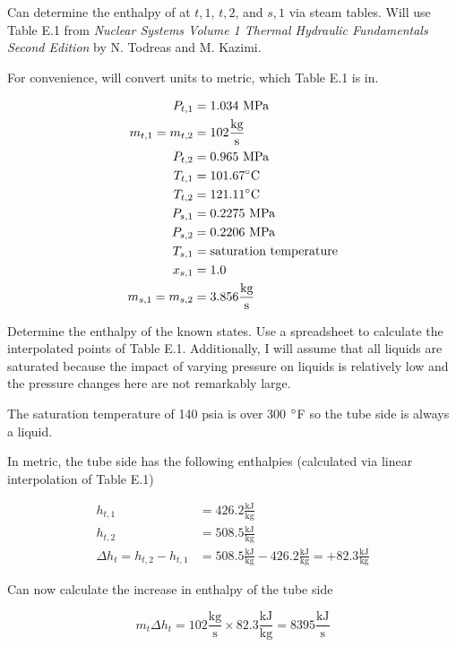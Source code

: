 \documentclass{article}
\begin{document}
Can determine the enthalpy of at $t,1$, $t,2$, and $s,1$ via steam tables. Will use Table E.1 from \textit{Nuclear Systems Volume 1 Thermal Hydraulic Fundamentals Second Edition} by N. Todreas and M. Kazimi.

For convenience, will convert units to metric, which Table E.1 is in.

\begin{align*}
    P_{t,1} &= 1.034 \text{ MPa} \\
    m_{t,1} = m_{t,2} &= 102 \frac{\text{kg}}{\text{s}} \\
    P_{t,2} &= 0.965 \text{ MPa} \\
    T_{t,1} &= 101.67 \degree \text{C} \\
    T_{t,2} &= 121.11 \degree \text{C} \\
    P_{s,1} &= 0.2275 \text{ MPa} \\
    P_{s,2} &= 0.2206 \text{ MPa} \\
    T_{s,1} &= \text{saturation temperature} \\
    x_{s,1} &= 1.0 \\
    m_{s,1} = m_{s,2} &= 3.856 \frac{\text{kg}}{\text{s}}
\end{align*}

Determine the enthalpy of the known states. Use a spreadsheet to calculate the interpolated points of Table E.1. Additionally, I will assume that all liquids are saturated because the impact of varying pressure on liquids is relatively low and the pressure changes here are not remarkably large.

The saturation temperature of 140 psia is over 300 $\degree$F so the tube side is always a liquid.

In metric, the tube side has the following enthalpies (calculated via linear interpolation of Table E.1)

\begin{align*}
    h_{t,1} &= 426.2 \frac{\text{kJ}}{\text{kg}} \\
    h_{t,2} &= 508.5 \frac{\text{kJ}}{\text{kg}} \\
    \Delta h_t = h_{t,2} - h_{t,1} &= 508.5 \frac{\text{kJ}}{\text{kg}} - 426.2 \frac{\text{kJ}}{\text{kg}} = +82.3 \frac{\text{kJ}}{\text{kg}}
\end{align*}

Can now calculate the increase in enthalpy of the tube side

\begin{equation}
    m_t \Delta h_t = 102 \frac{\text{kg}}{\text{s}} \times 82.3 \frac{\text{kJ}}{\text{kg}} = 8395 \frac{\text{kJ}}{\text{s}}
\end{equation}
\end{document}
